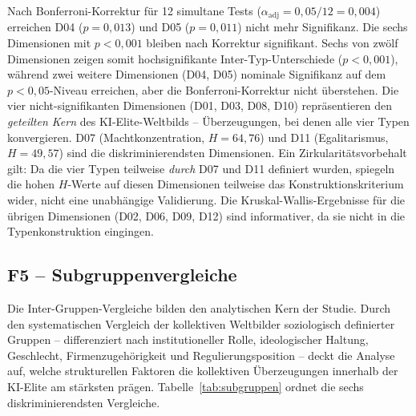 \documentclass[12pt,a4paper]{article}
\begin{document}
Nach Bonferroni-Korrektur f\"ur 12 simultane Tests ($\alpha_{\mathrm{adj}} = 0{,}05/12 = 0{,}004$) erreichen D04 ($p = 0{,}013$) und D05 ($p = 0{,}011$) nicht mehr Signifikanz. Die sechs Dimensionen mit $p < 0{,}001$ bleiben nach Korrektur signifikant. Sechs von zw\"olf Dimensionen zeigen somit hochsignifikante Inter-Typ-Unterschiede ($p < 0{,}001$), w\"ahrend zwei weitere Dimensionen (D04, D05) nominale Signifikanz auf dem $p < 0{,}05$-Niveau erreichen, aber die Bonferroni-Korrektur nicht \"uberstehen. Die vier nicht-signifikanten Dimensionen (D01, D03, D08, D10) repr\"asentieren den \emph{geteilten Kern} des KI-Elite-Weltbilds -- \"Uberzeugungen, bei denen alle vier Typen konvergieren. D07 (Machtkonzentration, $H = 64{,}76$) und D11 (Egalitarismus, $H = 49{,}57$) sind die diskriminierendsten Dimensionen. Ein Zirkularit\"atsvorbehalt gilt: Da die vier Typen teilweise \emph{durch} D07 und D11 definiert wurden, spiegeln die hohen $H$-Werte auf diesen Dimensionen teilweise das Konstruktionskriterium wider, nicht eine unabh\"angige Validierung. Die Kruskal-Wallis-Ergebnisse f\"ur die \"ubrigen Dimensionen (D02, D06, D09, D12) sind informativer, da sie nicht in die Typenkonstruktion eingingen.


\subsection{F5 -- Subgruppenvergleiche}
\label{sec:ergebnisse:f5}

Die Inter-Gruppen-Vergleiche bilden den analytischen Kern der Studie. Durch den systematischen Vergleich der kollektiven Weltbilder soziologisch definierter Gruppen -- differenziert nach institutioneller Rolle, ideologischer Haltung, Geschlecht, Firmenzugeh\"origkeit und Regulierungsposition -- deckt die Analyse auf, welche strukturellen Faktoren die kollektiven \"Uberzeugungen innerhalb der KI-Elite am st\"arksten pr\"agen. Tabelle~\ref{tab:subgruppen} ordnet die sechs diskriminierendsten Vergleiche.
\end{document}
